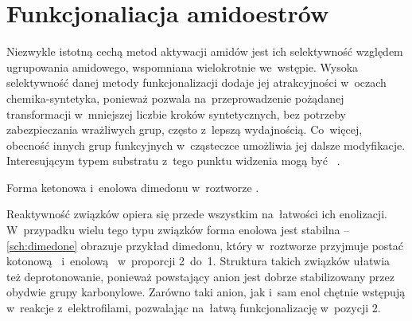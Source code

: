 \section{Funkcjonaliacja amidoestrów}\label{synthesis:amidoesters}


Niezwykle istotną cechą metod aktywacji amidów jest ich selektywność
  względem ugrupowania amidowego, wspomniana wielokrotnie we~wstępie.
Wysoka selektywność danej metody funkcjonalizacji dodaje jej atrakcyjności w~oczach
  chemika-syntetyka, ponieważ pozwala na~przeprowadzenie pożądanej transformacji
  w~mniejszej liczbie kroków syntetycznych, bez potrzeby zabezpieczania wrażliwych grup,
  często z~lepszą wydajnością.
Co~więcej, obecność innych grup funkcyjnych w~cząsteczce umożliwia jej dalsze modyfikacje.
Interesującym typem substratu z~tego punktu widzenia mogą być
  ~.

\begin{marginscheme}
  
  \caption{Forma ketonowa i~enolowa dimedonu w~roztworze .}
  \label{sch:dimedone}
\end{marginscheme}
Reaktywność związków  opiera się przede wszystkim na~łatwości
  ich enolizacji.
W~przypadku wielu tego typu związków forma enolowa jest stabilna \---
  \cref{sch:dimedone} obrazuje przykład dimedonu, który w~roztworze  przyjmuje postać kotonową~
  i~enolową~ w~proporcji 2~do~1.
Struktura takich związków ułatwia też deprotonowanie, ponieważ powstający anion jest
  dobrze stabilizowany przez obydwie grupy karbonylowe.
Zarówno taki anion, jak i~sam enol chętnie wstępują w~reakcje z~elektrofilami,
  pozwalając na~łatwą funkcjonalizację w~pozycji 2.

